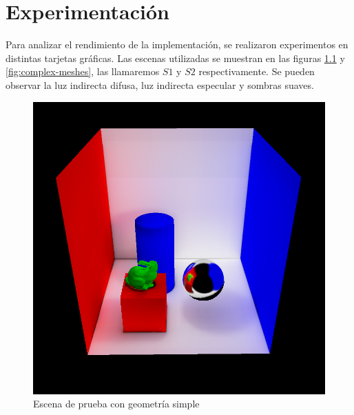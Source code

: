 \graphicspath{{chapters/5_experimentos/figures/}}

\chapter{Experimentación}\label{chap:experiments}

Para analizar el rendimiento de la implementación, se realizaron experimentos en distintas tarjetas gráficas.
Las escenas utilizadas se muestran en las figuras \ref{fig:cornell-box-full} y \ref{fig:complex-meshes}, las llamaremos $S1$ y $S2$ respectivamente.
Se pueden observar la luz indirecta difusa, luz indirecta especular y sombras suaves.

\begin{figure}[ht]
	\centering
	\includegraphics[width=\textwidth]{cornell-box-full.png}
	\caption{Escena de prueba con geometría simple}
	\label{fig:cornell-box-full}
\end{figure}

